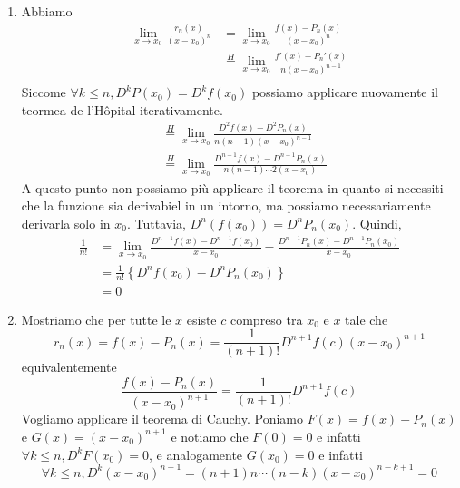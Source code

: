 \documentclass[a4paper]{article}
\begin{document}
\begin{radioactive}
\begin{snippetproof}{}
    \begin{enumerate}
        \item Abbiamo
        \begin{align*}
            \lim_{x\to x_0} \frac{r_n(x)}{{(x-x_0)}^n} &=
            \lim_{x\to x_0} \frac{f(x) - P_n(x)}{{(x-x_0)}^n} \\
            &\overset{H}{=} \lim_{x\to x_0} \frac{f'(x) - P_n'(x)}{n{(x-x_0)}^{n-1}} \\
        \end{align*}
        Siccome \(\forall k \leq n, D^k P(x_0) = D^k f(x_0)\) possiamo applicare nuovamente
        il teormea de l'Hôpital iterativamente.
        \begin{align*}
            &\overset{H}{=}\lim_{x\to x_0} \frac{
                D^2f(x) - D^2P_n(x)
            }{
                n(n-1){(x-x_0)}^{n-1}
            } \\
            &\overset{H}{=}\lim_{x\to x_0} \frac{
                D^{n-1}f(x) - D^{n-1}P_n(x)
            }{
                n(n-1) \cdots 2(x-x_0)
            }
        \end{align*}
        A questo punto non possiamo più applicare il teorema in quanto
        si necessiti che la funzione sia derivabiel in un intorno, ma
        possiamo necessariamente derivarla solo in \(x_0\).
        Tuttavia, \(D^n(f(x_0)) = D^n P_n(x_0)\). Quindi,
        \begin{align*}
            \frac{1}{n!} &= \lim_{x\to x_0}
            \frac{D^{n-1}f(x) - D^{n-1} f(x_0)}{x-x_0}
            - \frac{D^{n-1}P_n(x) - D^{n-1}P_n(x_0)}{x-x_0} \\
            &= \frac{1}{n!} \left\{
                D^n f(x_0) - D^n P_n(x_0)
            \right\} \\
            &= 0
        \end{align*}
        \item Mostriamo che per tutte le \(x\) esiste \(c\)
        compreso tra \(x_0\) e \(x\) tale che
        \[
            r_n(x) = f(x) - P_n(x) = \frac{1}{(n+1)!} D^{n+1}f(c)(x-x_0)^{n+1}
        \]
        equivalentemente
        \[
            \frac{f(x) - P_n(x)}{{(x-x_0)}^{n+1}} = \frac{1}{(n+1)!} D^{n+1}f(c)
        \]
        Vogliamo applicare il teorema di Cauchy. Poniamo \(F(x) = f(x) - P_n(x)\)
        e \(G(x) = {(x-x_0)}^{n+1}\) e notiamo che
        \(F(0) = 0\) e infatti \(\forall k \leq n, D^k F(x_0) = 0\),
        e analogamente \(G(x_0) = 0\) e infatti \[\forall k \leq n, D^k {(x-x_0)}^{n+1} = (n+1)n\cdots(n-k){(x-x_0)}^{n-k+1} = 0\]

\end{enumerate}
\end{snippetproof}
\end{radioactive}
\end{document}
